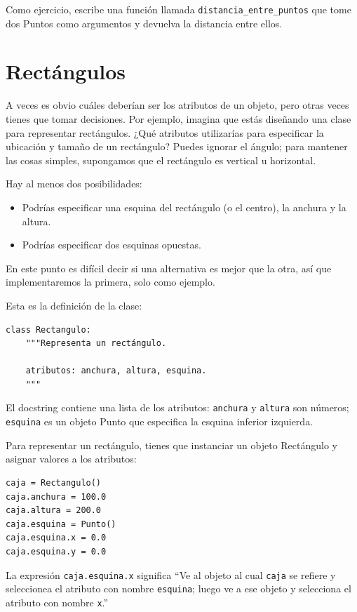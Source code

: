 \documentclass[10pt]{book}
\begin{document}
Como ejercicio, escribe una función llamada \verb"distancia_entre_puntos"
que tome dos Puntos como argumentos y devuelva la distancia entre
ellos.


\section{Rectángulos}
\label{rectangles}

A veces es obvio cuáles deberían ser los atributos de un objeto,
pero otras veces tienes que tomar decisiones.  Por ejemplo, imagina que
estás diseñando una clase para representar rectángulos. ¿Qué atributos
utilizarías para especificar la ubicación y tamaño de un rectángulo?  Puedes
ignorar el ángulo; para mantener las cosas simples, supongamos que el rectángulo es
vertical u horizontal.

Hay al menos dos posibilidades:

\begin{itemize}

\item Podrías especificar una esquina del rectángulo
(o el centro), la anchura y la altura.

\item Podrías especificar dos esquinas opuestas.

\end{itemize}

En este punto es difícil decir si una alternativa es mejor que
la otra, así que implementaremos la primera, solo como ejemplo.

Esta es la definición de la clase:

\begin{verbatim}
class Rectangulo:
    """Representa un rectángulo.

    atributos: anchura, altura, esquina.
    """
\end{verbatim}
%
El docstring contiene una lista de los atributos:  {\tt anchura} y
{\tt altura} son números; {\tt esquina} es un objeto Punto que
especifica la esquina inferior izquierda.

Para representar un rectángulo, tienes que instanciar un objeto Rectángulo
y asignar valores a los atributos:

\begin{verbatim}
caja = Rectangulo()
caja.anchura = 100.0
caja.altura = 200.0
caja.esquina = Punto()
caja.esquina.x = 0.0
caja.esquina.y = 0.0
\end{verbatim}
%
La expresión {\tt caja.esquina.x} significa
``Ve al objeto al cual {\tt caja} se refiere y seleccionea el atributo con nombre
{\tt esquina}; luego ve a ese objeto y selecciona el atributo con nombre
{\tt x}.''
\end{document}
